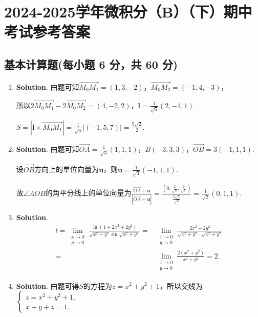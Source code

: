 \documentclass[../main.tex]{subfiles}
\begin{document}
\chapter{2024-2025学年微积分（B）（下）期中考试参考答案}
\section{基本计算题(每小题 6 分，共 60 分)}
\begin{enumerate}
    \item \textbf{Solution}. 由题可知$\overrightarrow{M_0M_1}=(1,3,-2)$，$\overrightarrow
              {M_0M_2}=(-1,4,-3)$，

          所以$2\overrightarrow{M_0M_1}-2\overrightarrow{M_0M_2}=(4,-2,2)$，$\boldsymbol
              {l}=\frac{1}{\sqrt{6}}(2,-1,1)$.

          $S=|\boldsymbol{l}\times\overrightarrow{M_0M_1}|=\frac{1}{\sqrt{6}}|(-1,5,7
              )|=\frac{5\sqrt{2}}{2}$.

    \item \textbf{Solution}. 由题可知$\overrightarrow{OA}=\frac{1}{\sqrt{3}}(1,1,
              1)$，$B(-3,3,3)$，$\overrightarrow{OB}=3(-1,1,1)$.

          设$\overrightarrow{OB}$方向上的单位向量为$\boldsymbol{u}$，则$\boldsymbol{u}
              =\frac{1}{\sqrt{3}}(-1,1,1)$.

          故$\angle AOB$的角平分线上的单位向量为$\frac{\overrightarrow{OA}+\boldsymbol{u}}{|\overrightarrow{OA}+\boldsymbol{u}|}
              =\frac{(0,\frac{2}{\sqrt{3}},\frac{2}{\sqrt{3}})}{\frac{2\sqrt{2}}{\sqrt{3}}}
              =\frac{1}{\sqrt{2}}(0,1,1)$.

    \item \textbf{Solution}.
          \[
              \begin{aligned}
                  l = \lim_{\substack{x\to 0 \\ y\to 0}}\frac{\ln\left(1+2x^2+2y^2\right)}{\sqrt{x^2+y^2}\sin\sqrt{x^2+y^2}}= {} & \lim_{\substack{x\to 0 \\ y\to 0}}\frac{2x^2+2y^2}{\sqrt{x^2+y^2}\cdot\sqrt{x^2+y^2}} \\
                  = {}                                                                                                           & \lim_{\substack{x\to 0 \\ y\to 0}}\frac{2(x^2+y^2)}{x^2+y^2}=2.
              \end{aligned}
          \]

    \item \textbf{Solution}. 由题可得$S$的方程为$z=x^{2}+y^{2}+1$，所以交线为$\begin{cases}
                  z=x^{2}+y^{2}+1, \\
                  x+y+z=1.
              \end{cases}$


\end{enumerate}
\end{document}
